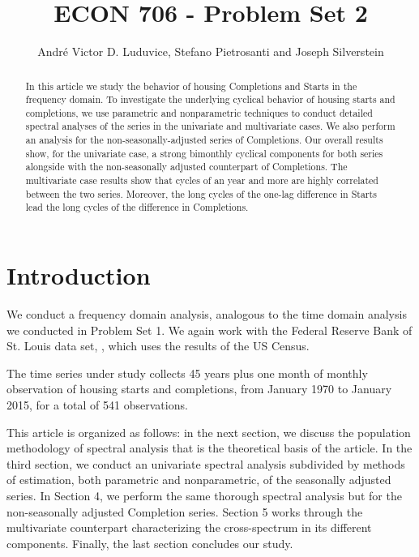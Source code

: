 \documentclass[12pt]{article} %
\begin{document}
\title{ECON 706 - Problem Set 2}
\author{Andr\'e Victor D. Luduvice, Stefano Pietrosanti and Joseph Silverstein}

\maketitle

\begin{abstract}
In this article we study the behavior of housing Completions and Starts in the frequency domain. To investigate the underlying cyclical behavior of housing starts and completions, we use parametric and nonparametric techniques to conduct detailed spectral analyses of the series in the univariate and multivariate cases. We also perform an analysis for the non-seasonally-adjusted series of Completions. Our overall results show, for the univariate case, a strong bimonthly cyclical components for both series alongside with the non-seasonally adjusted counterpart of Completions. The multivariate case results show that cycles of an year and more are highly correlated between the two series. Moreover, the long cycles of the one-lag difference in Starts lead the long cycles of the difference in Completions.

\end{abstract}

\section{Introduction}

We conduct a frequency domain analysis, analogous to the time domain analysis we conducted in Problem Set 1. We again work with the Federal Reserve Bank of St. Louis data set, \citep{dataset}, which uses the results of the US Census.

The time series under study collects 45 years plus one month of monthly observation of housing starts and completions, from January 1970 to January 2015, for a total of 541 observations.

This article is organized as follows: in the next section, we discuss the population methodology of spectral analysis that is the theoretical basis of the article. In the third section, we conduct an univariate spectral analysis subdivided by methods of estimation, both parametric and nonparametric, of the seasonally adjusted series. In Section 4, we perform the same thorough spectral analysis but for the non-seasonally adjusted Completion series. Section 5 works through the multivariate counterpart characterizing the cross-spectrum in its different components. Finally, the last section concludes our study.
\end{document}
